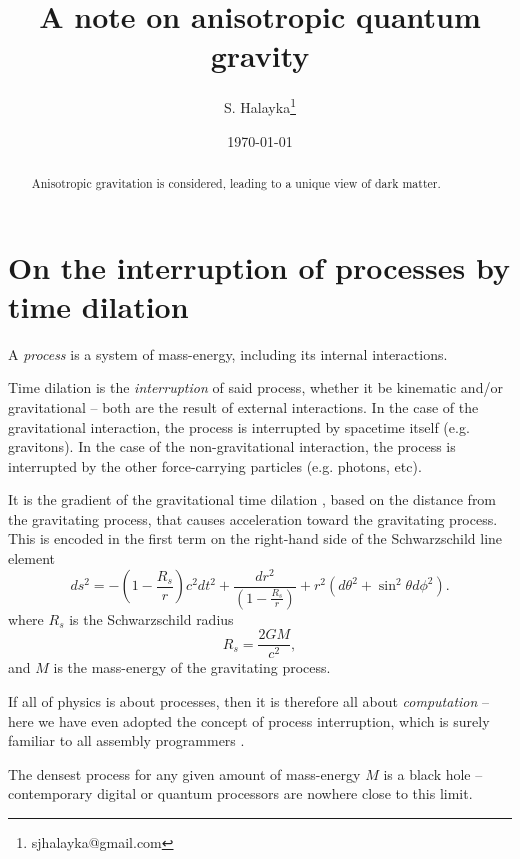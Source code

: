 \documentclass[12pt]{article}
\title{A note on anisotropic quantum gravity}
\author{S. Halayka\footnote{sjhalayka@gmail.com}}
\date{\today\;\currenttime}
\begin{document}
 
\maketitle

\begin{abstract}
Anisotropic gravitation is considered, leading to a unique view of dark matter.
\end{abstract}






\section{On the interruption of processes by time dilation}

A {\textit{process}} is a system of mass-energy, including its internal interactions.

Time dilation is the {\textit{interruption}} of said process, whether it be kinematic and/or gravitational -- both are the result of external interactions.
In the case of the gravitational interaction, the process is interrupted by spacetime itself (e.g. gravitons).
In the case of the non-gravitational interaction, the process is interrupted by the other force-carrying particles (e.g. photons, etc).

It is the gradient of the gravitational time dilation \cite{misner}, based on the distance from the gravitating process, that causes acceleration toward the gravitating process.
This is encoded in the first term on the right-hand side of the Schwarzschild line element
\begin{equation}
ds^2 = -\left( 1 - \frac{R_s}{r} \right) c^2 dt^2 + \frac{dr^2}{\left( 1 - \frac{R_s}{r} \right)} + r^2 (d\theta^2 + \sin^2 \theta d\phi^2).
\end{equation}
where $R_s$ is the Schwarzschild radius
\begin{equation}
R_s = \frac{2GM}{c^2},
\end{equation}
and $M$ is the mass-energy of the gravitating process.

If all of physics is about processes, then it is therefore all about {\textit{computation}} \cite{zuse, wolfram} -- here we have even adopted the concept of process interruption, which is surely familiar to all assembly programmers \cite{abrash}.

The densest process for any given amount of mass-energy $M$ is a black hole -- contemporary digital or quantum processors are nowhere close to this limit.
\end{document}
